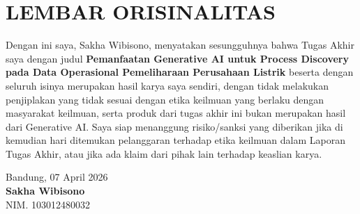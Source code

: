 \chapter*{LEMBAR ORISINALITAS}

Dengan ini saya, Sakha Wibisono, menyatakan sesungguhnya bahwa Tugas Akhir saya dengan judul
\textbf{Pemanfaatan Generative AI untuk Process Discovery pada Data Operasional Pemeliharaan Perusahaan Listrik} beserta dengan seluruh isinya merupakan hasil karya saya sendiri, dengan tidak
melakukan penjiplakan yang tidak sesuai dengan etika keilmuan yang berlaku dengan masyarakat keilmuan,
serta produk dari tugas akhir ini bukan merupakan hasil dari Generative AI. Saya siap menanggung
risiko/sanksi yang diberikan jika di kemudian hari ditemukan pelanggaran terhadap etika keilmuan dalam
Laporan Tugas Akhir, atau jika ada klaim dari pihak lain terhadap keaslian karya.

\vspace{2cm}

\begin{flushright}
  Bandung, 07 April 2026 \\[2cm]
  \textbf{Sakha Wibisono} \\
  NIM. 103012480032
\end{flushright}
